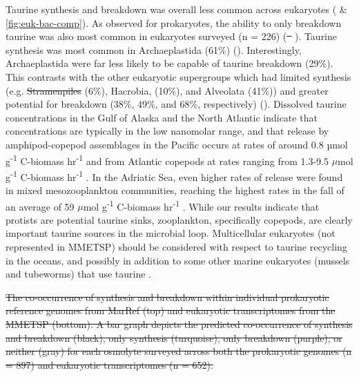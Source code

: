 \documentclass[utf8]{frontiersSCNS} %
\providecommand{\DIFaddtex}[1]{{\protect\color{blue}\uwave{#1}}} %
\providecommand{\DIFdeltex}[1]{{\protect\color{red}\sout{#1}}}                      %
\providecommand{\DIFaddbegin}{} %
\providecommand{\DIFaddend}{} %
\providecommand{\DIFdelbegin}{} %
\providecommand{\DIFdelend}{} %
\providecommand{\DIFdelFL}[1]{\DIFdel{#1}} %
\providecommand{\DIFadd}[1]{\texorpdfstring{\DIFaddtex{#1}}{#1}} %
\providecommand{\DIFdel}[1]{\texorpdfstring{\DIFdeltex{#1}}{}} %
\begin{document}
Taurine synthesis and breakdown was overall less common across eukaryotes ( \& \ref{fig:euk-bac-comp}). As observed for prokaryotes, the ability to only breakdown taurine was also most common in eukaryotes surveyed (n = 226) (\DIFdelbegin \DIFdel{\mbox{%
}%
}\DIFdelend \DIFaddbegin \DIFadd{\mbox{%
}%
}\DIFaddend ). Taurine synthesis was most common in Archaeplastida (61\%) (). Interestingly, Archaeplastida were far less likely to be capable of taurine breakdown (29\%). This contrasts with the other eukaryotic supergroups which had limited synthesis (e.g. \DIFdelbegin \DIFdel{Stramenpiles }\DIFdelend \DIFaddbegin \DIFadd{Stramenopiles }\DIFaddend (6\%), Hacrobia, (10\%), and Alveolata (41\%)) and greater potential for breakdown (38\%, 49\%, and 68\%, respectively) (). Dissolved taurine concentrations in the Gulf of Alaska and the North Atlantic indicate that concentrations are typically in the low nanomolar range, and that release by amphipod-copepod assemblages in the Pacific occurs at rates of around 0.8 µmol g\textsuperscript{-1} C-biomass hr\textsuperscript{-1} and from Atlantic copepods at rates ranging from 1.3-9.5 $\mu$mol g\textsuperscript{-1} C-biomass hr\textsuperscript{-1} \citep{Clifford2017}. In the Adriatic Sea, even higher rates of release were found in mixed mesozooplankton communities, reaching the highest rates in the fall of an average of 59 $\mu$mol g\textsuperscript{-1} C-biomass hr\textsuperscript{-1} \citep{Clifford2020}. While our results indicate that protists are potential taurine sinks, zooplankton, specifically copepods, are clearly important taurine sources in the microbial loop. Multicellular eukaryotes (not represented in MMETSP) should be considered with respect to taurine recycling in the oceans, and possibly in addition to some other marine eukaryotes (mussels and tubeworms) that use taurine \citep{Yin2000,Hosoi2005}.


\DIFdelbegin %
{%
\DIFdelFL{The co-occurrence of synthesis and breakdown within individual prokaryotic reference genomes from MarRef (top) and eukaryotic transcriptomes from the MMETSP (bottom). A bar graph depicts the predicted co-occurrence of synthesis and breakdown (black), only synthesis (turquoise), only breakdown (purple), or neither (gray) for each osmolyte surveyed across both the prokaryotic genomes (n = 897) and eukaryotic transcriptomes (n = 652). }}
\end{document}
